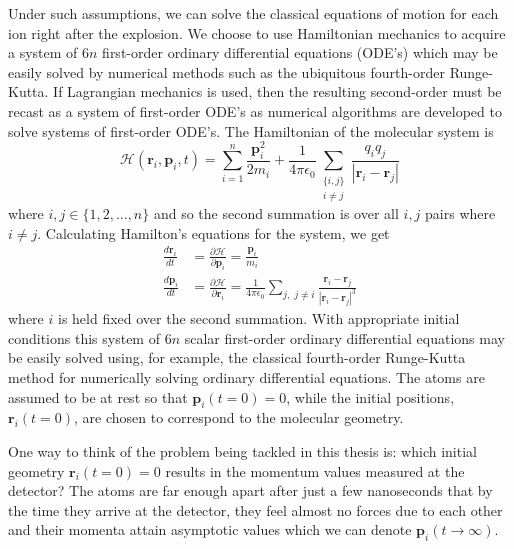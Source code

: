 Under such assumptions, we can solve the classical equations of motion for each ion right after the explosion. We choose to use Hamiltonian mechanics to acquire a system of $6n$ first-order ordinary differential equations (ODE's) which may be easily solved by numerical methods such as the ubiquitous fourth-order Runge-Kutta. If Lagrangian mechanics is used, then the resulting second-order must be recast as a system of first-order ODE's as numerical algorithms are developed to solve systems of first-order ODE's. The Hamiltonian of the molecular system is
\begin{equation}
\mathcal{H}(\mathbf{r}_i, \mathbf{p}_i, t) = \sum_{i=1}^n \frac{\mathbf{p}_i^2}{2m_i} + \frac{1}{4\pi\epsilon_0}\sum_{\substack{\lbrace i,j\rbrace\\ i \ne j}} \frac{q_iq_j}{|\mathbf{r}_i-\mathbf{r}_j|}
\end{equation}
where $i,j \in \lbrace 1,2,\dots, n \rbrace$ and so the second summation is over all $i,j$ pairs where $i \ne j$. Calculating Hamilton's equations for the system, we get
\begin{subequations}
  \begin{align}
  \frac{d\mathbf{r}_i}{dt} &= \frac{\partial \mathcal{H}}{\partial \mathbf{p}_i} = \frac{\mathbf{p}_i}{m_i} \\
  \frac{d\mathbf{p}_i}{dt} &= \frac{\partial \mathcal{H}}{\partial \mathbf{r}_i} = \frac{1}{4\pi\epsilon_0}\sum_{j, \; j \ne i} \frac{\mathbf{r}_i - \mathbf{r}_j}{|\mathbf{r}_i - \mathbf{r}_j|^3}
  \end{align}
\end{subequations}
where $i$ is held fixed over the second summation. With appropriate initial conditions this system of $6n$ scalar first-order ordinary differential equations may be easily solved using, for example, the classical fourth-order Runge-Kutta method for numerically solving ordinary differential equations. The atoms are assumed to be at rest so that $\mathbf{p}_i(t=0) = 0$, while the initial positions, $\mathbf{r}_i(t=0)$, are chosen to correspond to the molecular geometry.

One way to think of the problem being tackled in this thesis is: which initial geometry $\mathbf{r}_i(t=0) = 0$ results in the momentum values measured at the detector? The atoms are far enough apart after just a few nanoseconds that by the time they arrive at the detector, they feel almost no forces due to each other and their momenta attain asymptotic values which we can denote $\mathbf{p}_i(t\rightarrow\infty)$.

